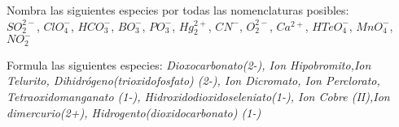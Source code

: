 \begin{problem}
	Nombra las siguientes especies por todas las nomenclaturas posibles:\\ $SO_2^{2-}$, $ClO_4^{-}$, $HCO_3^{-}$, $BO_3^{-}$, $PO_3^{-}$, $Hg_2^{2+}$, $CN^{-}$, $O_2^{2-}$, $Ca^{2+}$, $HTeO_4^{-}$, $MnO_4^{-}$, $NO_2^{-}$\\
\end{problem}
\begin{problem}
Formula las siguientes especies: \textit{Dioxocarbonato(2-), Ion Hipobromito,Ion Telurito, Dihidrógeno(trioxidofosfato) (2-), Ion Dicromato, Ion Perclorato, Tetraoxidomanganato (1-), Hidroxidodioxidoseleniato(1-), Ion Cobre (II),Ion dimercurio(2+), Hidrogento(dioxidocarbonato) (1-)}
\end{problem}